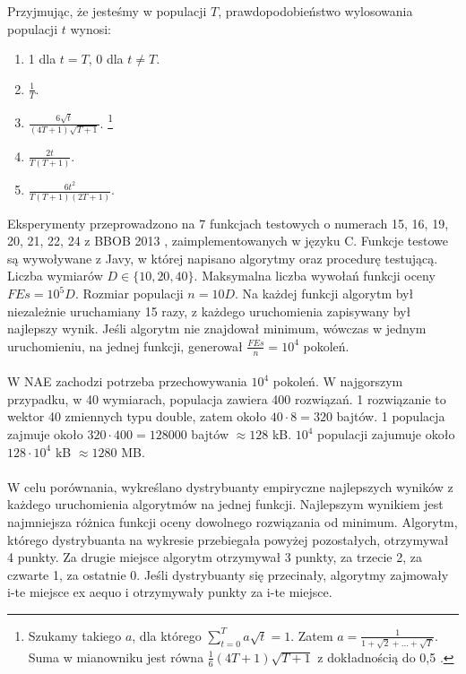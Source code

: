 \documentclass[12pt, a4paper]{article}
\begin{document}
Przyjmując, że jesteśmy w populacji $T$, prawdopodobieństwo wylosowania populacji $t$ wynosi:
\begin{enumerate}
 \item 1 dla $t=T$, 0 dla $t \neq T$.
 \item $\frac{1}{T}$.
 \item $\frac{6\sqrt{t}}{(4T+1)\sqrt{T+1}}$.
\footnote{Szukamy takiego $a$, dla którego $\sum\limits_{t=0}^T a\sqrt{t} = 1$. Zatem $a = \frac{1}{1 + \sqrt{2} + \dots + \sqrt{T}}$. 
Suma w mianowniku jest równa $\frac{1}{6}(4T+1)\sqrt{T+1}$ z dokładnością do 0,5 \cite{snehal}.}
 \item $\frac{2t}{T(T+1)}$.
 \item $\frac{6t^2}{T(T+1)(2T+1)}$.
\end{enumerate}

Eksperymenty przeprowadzono na 7 funkcjach testowych o numerach 15, 16, 19, 20, 21, 22, 24 z BBOB 2013 \cite{finck, hansen}, 
zaimplementowanych w języku C.
Funkcje testowe są wywoływane z Javy, w której napisano algorytmy oraz procedurę testującą.
Liczba wymiarów $D \in \{10, 20, 40\}$. Maksymalna liczba wywołań funkcji oceny $FEs = 10^5D$. 
Rozmiar populacji $n = 10D$. 
Na każdej funkcji algorytm był niezależnie uruchamiany 15 razy, z każdego uruchomienia zapisywany był najlepszy wynik.
Jeśli algorytm nie znajdował minimum, wówczas w jednym uruchomieniu, na jednej funkcji, 
generował $\frac{FEs}{n} = 10^4$ pokoleń. \\
\\
W NAE zachodzi potrzeba przechowywania $10^4$ pokoleń. W najgorszym przypadku, w 40 wymiarach, populacja zawiera 400 rozwiązań.
1 rozwiązanie to wektor 40 zmiennych typu double, zatem około $40\cdot8=320$ bajtów. 
1 populacja zajmuje około $320\cdot400 = 128000$ bajtów $\approx 128$ kB. 
$10^4$ populacji zajumuje około $128 \cdot 10^4$ kB $\approx 1280$ MB. \\
\\
W celu porównania, wykreślano dystrybuanty empiryczne najlepszych wyników z każdego uruchomienia 
algorytmów na jednej funkcji. Najlepszym wynikiem jest najmniejsza różnica funkcji oceny dowolnego rozwiązania od minimum.
Algorytm, którego dystrybuanta na wykresie przebiegała powyżej pozostałych, otrzymywał 4 punkty. 
Za drugie miejsce algorytm otrzymywał 3 punkty, za trzecie 2, za czwarte 1, za ostatnie 0. 
Jeśli dystrybuanty się przecinały, algorytmy zajmowały i-te miejsce ex aequo i otrzymywały punkty za i-te miejsce.

\nocite{*}


\end{document}
